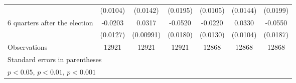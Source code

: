 \begin{table}[htbp]
\begin{tabular}{l*{6}{c}}
                    &    (0.0104)         &    (0.0142)         &    (0.0195)         &    (0.0105)         &    (0.0144)         &    (0.0199)         \\
[1em]
 6 quarters after the election&     -0.0203         &      0.0317\sym{**} &     -0.0520\sym{**} &     -0.0220         &      0.0330\sym{**} &     -0.0550\sym{**} \\
                    &    (0.0127)         &   (0.00991)         &    (0.0180)         &    (0.0130)         &    (0.0104)         &    (0.0187)         \\
\hline
Observations        &       12921         &       12921         &       12921         &       12868         &       12868         &       12868         \\
\hline\hline
\multicolumn{7}{l}{\footnotesize Standard errors in parentheses}\\
\multicolumn{7}{l}{\footnotesize \sym{*} \(p<0.05\), \sym{**} \(p<0.01\), \sym{***} \(p<0.001\)}\\
\end{tabular}
\end{table}
